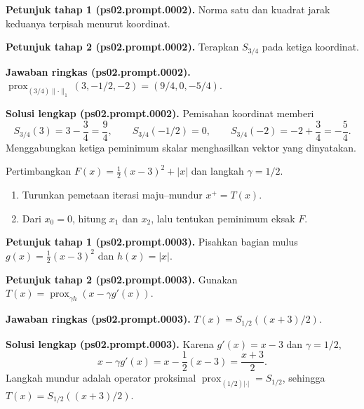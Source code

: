 \par\noindent\textbf{Petunjuk tahap 1 (ps02.prompt.0002).}
Norma satu dan kuadrat jarak keduanya terpisah menurut koordinat.
\label{orig03:ps02:hint1:0002}
\par\noindent\textbf{Petunjuk tahap 2 (ps02.prompt.0002).}
Terapkan $S_{3/4}$ pada ketiga koordinat.
\label{orig03:ps02:hint2:0002}
\par\noindent\textbf{Jawaban ringkas (ps02.prompt.0002).}
$\operatorname{prox}_{(3/4)\lVert\cdot\rVert_1}(3,-1/2,-2)
=(9/4,0,-5/4)$.
\label{orig03:ps02:answer:0002}
\par\noindent\textbf{Solusi lengkap (ps02.prompt.0002).}
Pemisahan koordinat memberi
\[
 S_{3/4}(3)=3-\frac34=\frac94,
 \qquad S_{3/4}(-1/2)=0,
 \qquad S_{3/4}(-2)=-2+\frac34=-\frac54.
\]
Menggabungkan ketiga peminimum skalar menghasilkan vektor yang dinyatakan.
\label{orig03:ps02:solution:0002}

\begin{exercise}
\label{orig03:ps02:problem:0002}
Pertimbangkan
$F(x)=\tfrac12(x-3)^2+|x|$ dan langkah $\gamma=1/2$.
\begin{enumerate}
\item\label{orig03:ps02:prompt:0003}
Turunkan pemetaan iterasi maju--mundur $x^+=T(x)$.
\item\label{orig03:ps02:prompt:0004}
Dari $x_0=0$, hitung $x_1$ dan $x_2$, lalu tentukan peminimum eksak $F$.
\end{enumerate}
\end{exercise}

\par\noindent\textbf{Petunjuk tahap 1 (ps02.prompt.0003).}
Pisahkan bagian mulus $g(x)=\tfrac12(x-3)^2$ dan $h(x)=|x|$.
\label{orig03:ps02:hint1:0003}
\par\noindent\textbf{Petunjuk tahap 2 (ps02.prompt.0003).}
Gunakan $T(x)=\operatorname{prox}_{\gamma h}(x-\gamma g'(x))$.
\label{orig03:ps02:hint2:0003}
\par\noindent\textbf{Jawaban ringkas (ps02.prompt.0003).}
$T(x)=S_{1/2}((x+3)/2)$.
\label{orig03:ps02:answer:0003}
\par\noindent\textbf{Solusi lengkap (ps02.prompt.0003).}
Karena $g'(x)=x-3$ dan $\gamma=1/2$,
\[
 x-\gamma g'(x)=x-\frac12(x-3)=\frac{x+3}{2}.
\]
Langkah mundur adalah operator proksimal $\operatorname{prox}_{(1/2)|\cdot|}
=S_{1/2}$, sehingga $T(x)=S_{1/2}((x+3)/2)$.
\label{orig03:ps02:solution:0003}

